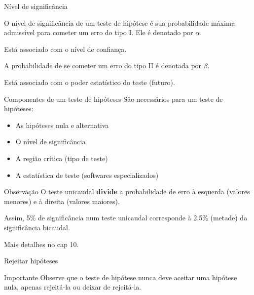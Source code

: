 \documentclass{beamer}
\begin{document}
\begin{frame}{Nível de significância}
  \begin{definition}
    O \alert{nível de significância} de um teste de hipótese é sua
    probabilidade máxima admissível para cometer um erro do tipo
    I. Ele é denotado por $\alpha$.

    \bigskip
    Está associado com o nível de confiança.
  \end{definition}
  \begin{definition}
    A probabilidade de se cometer um erro do tipo II é denotada por
    $\beta$.

    \bigskip Está associado com o poder estatístico do teste (futuro).
  \end{definition}
\end{frame}

\begin{frame}{Componentes de um teste de hipóteses}
  São necessários para um teste de hipóteses:
  \begin{itemize}
  \item As hipóteses nula e alternativa
  \item O nível de significância
  \item A região crítica (tipo de teste)
  \item A estatística de teste (softwares especializados)
  \end{itemize}
  \begin{block}{Observação}
    O teste unicaudal {\bf divide} a probabilidade de erro à esquerda (valores menores) e à direita (valores maiores).

    \bigskip
    Assim, 5\% de significância num teste unicaudal corresponde à 2.5\% (metade) da significância bicaudal.

    \bigskip
    Mais detalhes no cap 10.
  \end{block}
\end{frame}

\begin{frame}{Rejeitar hipóteses}
  \begin{block}{Importante}
    Observe que o teste de hipótese nunca deve \alert{aceitar} uma
    hipótese nula, apenas rejeitá-la ou deixar de rejeitá-la.
  \end{block}
\end{frame}
\end{document}
